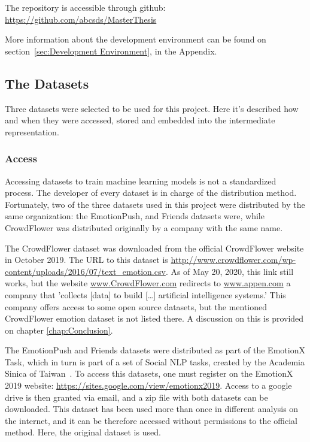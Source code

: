 The repository is accessible through github: \\
\url{https://github.com/abcsds/MasterThesis}

More information about the development environment can be found on section~\ref{sec:Development Environment}, in the Appendix.

\subsection{The Datasets}\label{sub:The Datasets}
Three datasets were selected to be used for this project. Here it's described how and when they were accessed, stored and embedded into the intermediate representation.

\subsubsection{Access}\label{subs:Access}
Accessing datasets to train machine learning models is not a standardized process. The developer of every dataset is in charge of the distribution method. Fortunately, two of the three datasets used in this project were distributed by the same organization: the EmotionPush, and Friends datasets were, while CrowdFlower was distributed originally by a company with the same name.

The CrowdFlower dataset was downloaded from the official CrowdFlower website in October 2019. The URL to this dataset is \url{http://www.crowdflower.com/wp-content/uploads/2016/07/text_emotion.csv}. As of May 20, 2020, this link still works, but the website \url{www.CrowdFlower.com} redirects to \url{www.appen.com} a company that 'collects [data] to build [\ldots] artificial intelligence systems.' This company offers access to some open source datasets, but the mentioned CrowdFlower emotion dataset is not listed there. A discussion on this is provided on chapter \ref{chap:Conclusion}.

The EmotionPush and Friends datasets were distributed as part of the EmotionX Task, which in turn is part of a set of Social NLP tasks, created by the Academia Sinica of Taiwan~\cite{chen2018emotionlines}. To access this datasets, one must register on the EmotionX 2019 website: \url{https://sites.google.com/view/emotionx2019}. Access to a google drive is then granted via email, and a zip file with both datasets can be downloaded. This dataset has been used more than once in different analysis on the internet, and it can be therefore accessed without permissions to the official method. Here, the original dataset is used.

